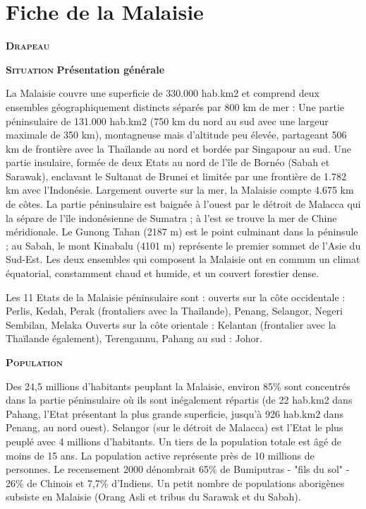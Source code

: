 \section{Fiche de la Malaisie}

\begin{multicols}{2}

\textbf{\textsc{Drapeau}}



\textbf{\textsc{Situation}}
\textbf{Présentation générale}

La Malaisie couvre une superficie de 330.000 hab.km2 et comprend deux ensembles géographiquement distincts séparés par 800 km de mer :  Une partie péninsulaire de 131.000 hab.km2 (750 km du nord au sud avec une largeur maximale de 350 km), montagneuse mais d'altitude peu élevée, partageant 506 km de frontière avec la Thaïlande au nord et bordée par Singapour au sud.
Une partie insulaire, formée de deux Etats au nord de l'île de Bornéo (Sabah et Sarawak), enclavant le Sultanat de Brunei et limitée par une frontière de 1.782 km avec l'Indonésie. Largement ouverte sur la mer, la Malaisie compte 4.675 km de côtes. La partie péninsulaire est baignée à l'ouest par le détroit de Malacca qui la sépare de l'île indonésienne de Sumatra ; à l'est se trouve la mer de Chine méridionale. Le Gunong Tahan (2187 m) est le point culminant dans la péninsule ; au Sabah, le mont Kinabalu (4101 m) représente le premier sommet de l'Asie du Sud-Est. Les deux ensembles qui composent la Malaisie ont en commun un climat équatorial, constamment chaud et humide, et un couvert forestier dense.

Les 11 Etats de la Malaisie péninsulaire sont :  ouverts sur la côte occidentale : Perlis, Kedah, Perak (frontaliers avec la Thaïlande), Penang, Selangor, Negeri Sembilan, Melaka Ouverts sur la côte orientale : Kelantan (frontalier avec la Thaïlande également), Terengannu, Pahang au sud : Johor.

\textbf{\textsc{Population}}

Des 24,5 millions d'habitants peuplant la Malaisie, environ 85\% sont concentrés dans la partie péninsulaire où ils sont inégalement répartis (de 22 hab.km2 dans Pahang, l'Etat présentant la plus grande superficie, jusqu'à 926 hab.km2 dans Penang, au nord ouest). Selangor (sur le détroit de Malacca) est l'Etat le plus peuplé avec 4 millions d'habitants. Un tiers de la population totale est âgé de moins de 15 ans. La population active représente près de 10 millions de personnes. Le recensement 2000 dénombrait 65\% de Bumiputras - "fils du sol" - 26\% de Chinois et 7,7\% d'Indiens. Un petit nombre de populations aborigènes subsiste en Malaisie (Orang Asli et tribus du Sarawak et du Sabah).


\end{multicols}
